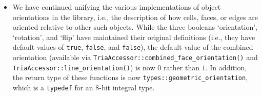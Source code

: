 \documentclass{ansarticle-preprint}
\begin{document}
\begin{itemize}
  \item We have continued unifying the various implementations of object
    orientations in the library, i.e., the description of how cells,
    faces, or edges are oriented relative to other such objects. While the three booleans `orientation', `rotation',
    and `flip' have maintained their original definitions (i.e., they have default
    values of \texttt{true}, \texttt{false}, and \texttt{false}), the default
    value of the combined orientation (available via
    \texttt{TriaAccessor::combined\_face\_orientation()} and
    \texttt{TriaAccessor::line\_orientation()}) is now $0$ rather than $1$. In
    addition, the return type of these functions is now
    \texttt{types::geometric\_orientation}, which is a \texttt{typedef} for an
    8-bit integral type.


\end{itemize}
\end{document}
